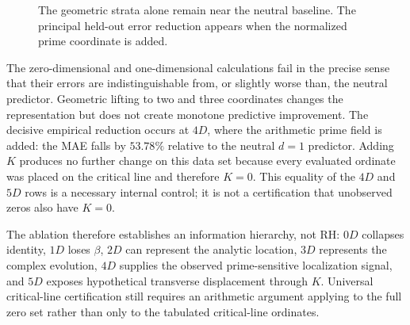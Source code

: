 \documentclass[11pt]{amsart}
\theoremstyle{definition}
\theoremstyle{remark}
\begin{document}
\begin{figure}[t]
\centering
{}
\caption{The geometric strata alone remain near the neutral baseline.  The principal held-out
error reduction appears when the normalized prime coordinate is added.}
\label{fig:ablation}
\end{figure}

The zero-dimensional and one-dimensional calculations fail in the precise sense that their
errors are indistinguishable from, or slightly worse than, the neutral predictor.  Geometric
lifting to two and three coordinates changes the representation but does not create monotone
predictive improvement.  The decisive empirical reduction occurs at $4D$, where the arithmetic
prime field is added: the MAE falls by $53.78\%$ relative to the neutral $d=1$ predictor.  Adding
$K$ produces no further change on this data set because every evaluated ordinate was placed on
the critical line and therefore $K=0$.  This equality of the $4D$ and $5D$ rows is a necessary
internal control; it is not a certification that unobserved zeros also have $K=0$.

The ablation therefore establishes an information hierarchy, not RH: $0D$ collapses identity,
$1D$ loses $\beta$, $2D$ can represent the analytic location, $3D$ represents the complex
evolution, $4D$ supplies the observed prime-sensitive localization signal, and $5D$ exposes
hypothetical transverse displacement through $K$.  Universal critical-line certification still
requires an arithmetic argument applying to the full zero set rather than only to the tabulated
critical-line ordinates.
\end{document}
